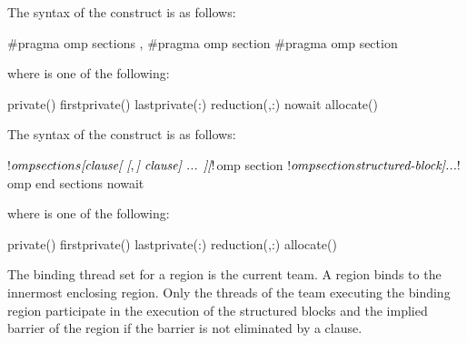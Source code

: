 \syntax
\begin{ccppspecific}
The syntax of the  construct is as follows:

\begin{ompcPragma}
#pragma omp sections \plc{[clause[ [},\plc{] clause] ... ] new-line}
   {
   \plc{[}#pragma omp section \plc{]}
   \plc{[}#pragma omp section 
      \plc{structured-block]}
   }
\end{ompcPragma}

where  is one of the following:

{}
\begin{indentedcodelist}
private()
firstprivate()
lastprivate(\plc{[ lastprivate-modifier}:\plc{] list})
reduction(\plc{[ reduction-modifier},\plc{]reduction-identifier }:)
nowait
allocate(\plc{[allocator: ]})
\end{indentedcodelist}
\end{ccppspecific}

\begin{fortranspecific}
The syntax of the  construct is as follows:

\begin{ompfPragma}
!$omp sections \plc{[clause[ [},\plc{] clause] ... ]}
   \plc{[}!$omp section\plc{]}
   \plc{[}!$omp section
      \plc{structured-block]}
   \plc{...}
!$omp end sections \plc{[}nowait\plc{]}
\end{ompfPragma}

\begin{samepage}
where  is one of the following:

{}
\begin{indentedcodelist}
private()
firstprivate()
lastprivate(\plc{[ lastprivate-modifier}:\plc{] list})
reduction(\plc{[ reduction-modifier},\plc{]reduction-identifier }:)
allocate(\plc{[allocator: ]})
\end{indentedcodelist}
\end{samepage}
\end{fortranspecific}

\binding
The binding thread set for a  region is the current team. A 
region binds to the innermost enclosing  region. Only the threads of the team
executing the binding  region participate in the execution of the structured
blocks and the implied barrier of the  region if the barrier is not eliminated
by a  clause.

